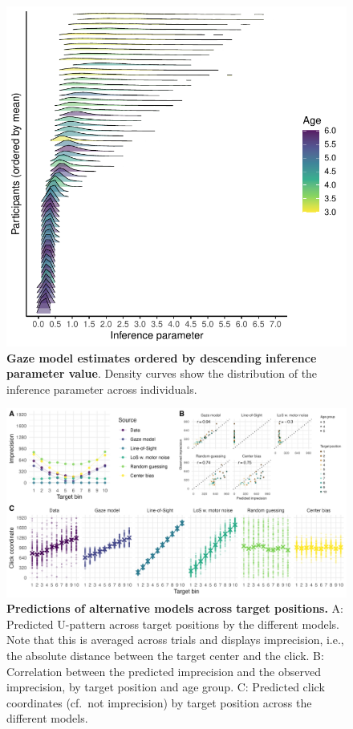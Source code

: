 \documentclass[
  man,mask,floatsintext]{apa7}
\begin{document}
\newpage



\begin{figure}[H]
\includegraphics[width=1\linewidth]{../figures/supplements_gazemodel_indinference} \caption{\textbf{Gaze model estimates ordered by descending inference parameter value}. Density curves show the distribution of the inference parameter across individuals.}\label{fig:S4}
\end{figure}

\newpage



\begin{figure}[H]
\includegraphics[width=1\linewidth]{../figures/gazemodel_simulated_u} \caption{\textbf{Predictions of alternative models across target positions.} A: Predicted U-pattern across target positions by the different models. Note that this is averaged across trials and displays imprecision, i.e., the absolute distance between the target center and the click. B: Correlation between the predicted imprecision and the observed imprecision, by target position and age group. C: Predicted click coordinates (cf.~not imprecision) by target position across the different models.}\label{fig:S5}
\end{figure}


\clearpage
\renewcommand{\listfigurename}{Figure captions}

\clearpage
\renewcommand{\listtablename}{Table captions}
\end{document}
